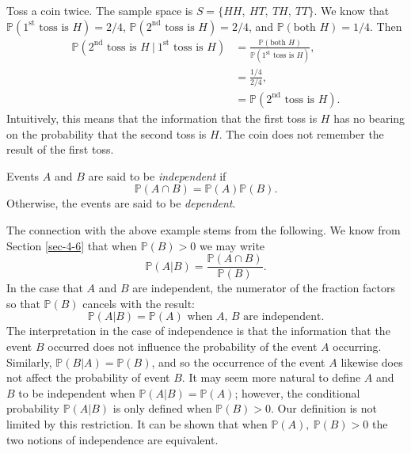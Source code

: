 \documentclass[captions=tableheading]{scrbook}
\begin{document}
Toss a coin twice. The sample space is \(S= \{ HH,\ HT,\ TH,\ TT \} \). We know that \(\mathbb{P}(1^{\mathrm{st}}\mbox{ toss is }H)=2/4\), \(\mathbb{P}(2^{\mathrm{nd}}\mbox{ toss is }H)=2/4\), and \(\mathbb{P}(\mbox{both }H)=1/4\). Then
\begin{align*} \mathbb{P}(2^{\mathrm{nd}}\mbox{ toss is }H\ |\ 1^{\mathrm{st}}\mbox{ toss is }H) & =\frac{\mathbb{P}(\mbox{both }H)}{\mathbb{P}(1^{\mathrm{st}}\mbox{ toss is }H)},\\
 & =\frac{1/4}{2/4},\\
 & =\mathbb{P}(2^{\mathrm{nd}}\mbox{ toss is }H).
\end{align*}
Intuitively, this means that the information that the first toss is \(H\) has no bearing on the probability that the second toss is \(H\). The coin does not remember the result of the first toss. 

\begin{defn}
Events \(A\) and \(B\) are said to be \emph{independent} if 
\begin{equation}
\mathbb{P}(A\cap B)=\mathbb{P}(A)\mathbb{P}(B).
\end{equation}
Otherwise, the events are said to be \emph{dependent}. 
\end{defn}

The connection with the above example stems from the following. We know from Section \ref{sec-4-6} that when \(\mathbb{P}(B)>0\) we may write
\begin{equation}
\mathbb{P}(A|B)=\frac{\mathbb{P}(A\cap B)}{\mathbb{P}(B)}.
\end{equation}
In the case that \(A\) and \(B\) are independent, the numerator of the fraction factors so that \(\mathbb{P}(B)\) cancels with the result:
\begin{equation}
\mathbb{P}(A|B)=\mathbb{P}(A)\mbox{ when \(A\), \(B\) are independent.}
\end{equation}
The interpretation in the case of independence is that the information that the event \(B\) occurred does not influence the probability of the event \(A\) occurring. Similarly, \(\mathbb{P}(B|A)=\mathbb{P}(B)\), and so the occurrence of the event \(A\) likewise does not affect the probability of event \(B\). It may seem more natural to define \(A\) and \(B\) to be independent when \(\mathbb{P}(A|B)=\mathbb{P}(A)\); however, the conditional probability \(\mathbb{P}(A|B)\) is only defined when \(\mathbb{P}(B)>0\). Our definition is not limited by this restriction. It can be shown that when \(\mathbb{P}(A),\ \mathbb{P}(B)>0\) the two notions of independence are equivalent.
\end{document}
